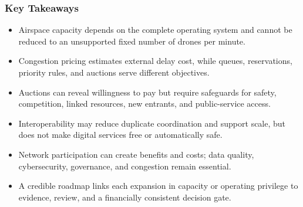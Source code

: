 \documentclass{beamer}
\begin{document}
\begin{frame}[t]
\frametitle{Key Takeaways}
\begin{itemize}
\item Airspace capacity depends on the complete operating system and cannot be reduced to an unsupported fixed number of drones per minute.
\item Congestion pricing estimates external delay cost, while queues, reservations, priority rules, and auctions serve different objectives.
\item Auctions can reveal willingness to pay but require safeguards for safety, competition, linked resources, new entrants, and public-service access.
\item Interoperability may reduce duplicate coordination and support scale, but does not make digital services free or automatically safe.
\item Network participation can create benefits and costs; data quality, cybersecurity, governance, and congestion remain essential.
\item A credible roadmap links each expansion in capacity or operating privilege to evidence, review, and a financially consistent decision gate.
\end{itemize}
\end{frame}
\end{document}
